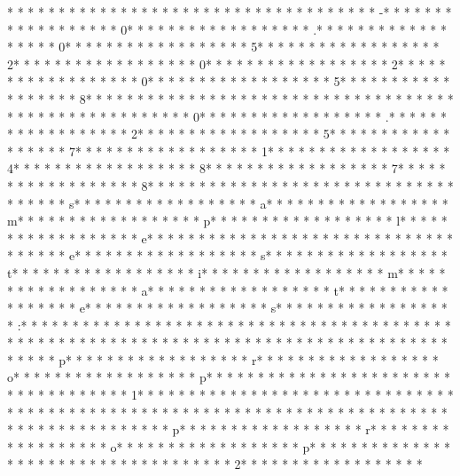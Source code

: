 * * *  * * *  * * *  *  * * *  *  * * *  *  * * *  * * *  * * *  *  * * *  *  * * *  * -* * *  * * *  * * *  *  * * *  *  * * *  * 0* * *  * * *  * * *  *  * * *  *  * * *  * .* * *  * * *  * * *  *  * * *  *  * * *  * 0* * *  * * *  * * *  *  * * *  *  * * *  * 5* * *  * * *  * * *  *  * * *  *  * * *  * 2* * *  * * *  * * *  *  * * *  *  * * *  * 0* * *  * * *  * * *  *  * * *  *  * * *  * 2* * *  * * *  * * *  *  * * *  *  * * *  * 0* * *  * * *  * * *  *  * * *  *  * * *  * 5* * *  * * *  * * *  *  * * *  *  * * *  * 8* * *  * * *  * * *  *  * * *  *  * * *  *  * * *  * * *  * * *  *  * * *  *  * * *  *  * * *  * * *  * * *  *  * * *  *  * * *  * 0* * *  * * *  * * *  *  * * *  *  * * *  * .* * *  * * *  * * *  *  * * *  *  * * *  * 2* * *  * * *  * * *  *  * * *  *  * * *  * 5* * *  * * *  * * *  *  * * *  *  * * *  * 7* * *  * * *  * * *  *  * * *  *  * * *  * 1* * *  * * *  * * *  *  * * *  *  * * *  * 4* * *  * * *  * * *  *  * * *  *  * * *  * 8* * *  * * *  * * *  *  * * *  *  * * *  * 7* * *  * * *  * * *  *  * * *  *  * * *  * 8* * *  * * *  * * *  *  * * *  *  * * *  * 
* * *  * * *  * * *  *  * * *  *  * * *  * s* * *  * * *  * * *  *  * * *  *  * * *  * a* * *  * * *  * * *  *  * * *  *  * * *  * m* * *  * * *  * * *  *  * * *  *  * * *  * p* * *  * * *  * * *  *  * * *  *  * * *  * l* * *  * * *  * * *  *  * * *  *  * * *  * e* * *  * * *  * * *  *  * * *  *  * * *  *  * * *  * * *  * * *  *  * * *  *  * * *  * e* * *  * * *  * * *  *  * * *  *  * * *  * s* * *  * * *  * * *  *  * * *  *  * * *  * t* * *  * * *  * * *  *  * * *  *  * * *  * i* * *  * * *  * * *  *  * * *  *  * * *  * m* * *  * * *  * * *  *  * * *  *  * * *  * a* * *  * * *  * * *  *  * * *  *  * * *  * t* * *  * * *  * * *  *  * * *  *  * * *  * e* * *  * * *  * * *  *  * * *  *  * * *  * s* * *  * * *  * * *  *  * * *  *  * * *  * :* * *  * * *  * * *  *  * * *  *  * * *  * 
* * *  * * *  * * *  *  * * *  *  * * *  *  * * *  * * *  * * *  *  * * *  *  * * *  *  * * *  * * *  * * *  *  * * *  *  * * *  *  * * *  * * *  * * *  *  * * *  *  * * *  * p* * *  * * *  * * *  *  * * *  *  * * *  * r* * *  * * *  * * *  *  * * *  *  * * *  * o* * *  * * *  * * *  *  * * *  *  * * *  * p* * *  * * *  * * *  *  * * *  *  * * *  *  * * *  * * *  * * *  *  * * *  *  * * *  * 1* * *  * * *  * * *  *  * * *  *  * * *  *  * * *  * * *  * * *  *  * * *  *  * * *  *  * * *  * * *  * * *  *  * * *  *  * * *  *  * * *  * * *  * * *  *  * * *  *  * * *  *  * * *  * * *  * * *  *  * * *  *  * * *  * p* * *  * * *  * * *  *  * * *  *  * * *  * r* * *  * * *  * * *  *  * * *  *  * * *  * o* * *  * * *  * * *  *  * * *  *  * * *  * p* * *  * * *  * * *  *  * * *  *  * * *  *  * * *  * * *  * * *  *  * * *  *  * * *  * 2* * *  * * *  * * *  *  * * *  *  * * *  * 
